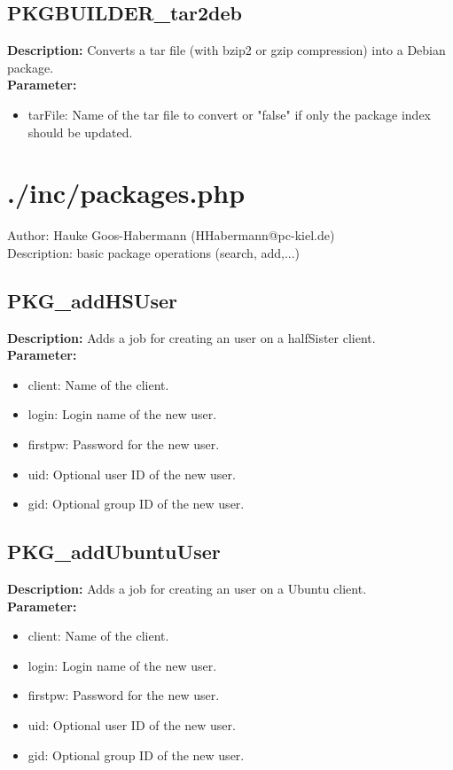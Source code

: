 \subsection{PKGBUILDER\_tar2deb}
\textbf{Description:} Converts a tar file (with bzip2 or gzip compression) into a Debian package.\\
\textbf{Parameter:}
\begin{itemize}
\item tarFile: Name of the tar file to convert or "false" if only the package index should be updated.
\end{itemize}

\newpage\section{./inc/packages.php}
Author: Hauke Goos-Habermann (HHabermann@pc-kiel.de)\\
Description: basic package operations (search, add,...)\\

\subsection{PKG\_addHSUser}
\textbf{Description:} Adds a job for creating an user on a halfSister client.\\
\textbf{Parameter:}
\begin{itemize}
\item client: Name of the client.
\item login: Login name of the new user.
\item firstpw: Password for the new user.
\item uid: Optional user ID of the new user.
\item gid: Optional group ID of the new user.
\end{itemize}

\subsection{PKG\_addUbuntuUser}
\textbf{Description:} Adds a job for creating an user on a Ubuntu client.\\
\textbf{Parameter:}
\begin{itemize}
\item client: Name of the client.
\item login: Login name of the new user.
\item firstpw: Password for the new user.
\item uid: Optional user ID of the new user.
\item gid: Optional group ID of the new user.
\end{itemize}

